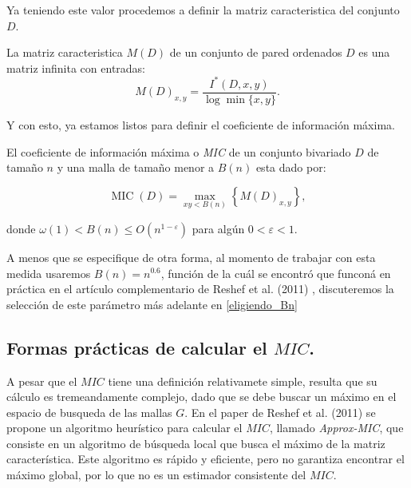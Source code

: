         Ya teniendo este valor procedemos a definir la matriz caracteristica del conjunto $D$.
    
        \begin{defn}
            La matriz caracteristica $M(D)$ de un conjunto de pared ordenados $D$ es una matriz infinita con entradas:
            $$
            M(D)_{x, y}=\frac{I^{*}(D, x, y)}{\log \min \{x, y\}}.
            $$
        \end{defn}

        Y con esto, ya estamos listos para definir el coeficiente de informaci\'on m\'axima.

        \begin{defn}
            El coeficiente de informaci\'on m\'axima o \textit{MIC} de un conjunto bivariado $D$ de tama\~no $n$ y una malla de tama\~no menor a $B(n)$ esta dado por:
    
            $$
            \operatorname{MIC}(D)=\max _{x y<B(n)}\left\{M(D)_{x, y}\right\},
            $$
    
            donde $\omega(1)<B(n) \leq O\left(n^{1-\varepsilon}\right)$ para alg\'un $0<\varepsilon<1$.
        \end{defn}
        \begin{rem}
            A menos que se especifique de otra forma, al momento de trabajar con esta medida usaremos $B(n)=n^{0.6}$, funci\'on de la cu\'al se encontr\'o que funcon\'a en pr\'actica en el art\'iculo complementario de Reshef et al. (2011) \cite[]{Reshef2011}, discuteremos la selecci\'on de este par\'ametro m\'as adelante en \ref{eligiendo_Bn}
        \end{rem}
    
    
        \subsection[Formas practicas de calcular el MIC.]{Formas pr\'acticas de calcular el $MIC$.}

        A pesar que el $MIC$ tiene una definici\'on relativamete simple, resulta que su c\'alculo es tremeandamente complejo, dado que se debe buscar un m\'aximo en el espacio de busqueda de las mallas $G$. En el paper de Reshef et al. (2011) \cite{Reshef2011} se propone un algoritmo heur\'istico para calcular el $MIC$, llamado \textit{Approx-MIC}, que consiste en un algoritmo de b\'usqueda local que busca el m\'aximo de la matriz caracter\'istica. Este algoritmo es r\'apido y eficiente, pero no garantiza encontrar el m\'aximo global, por lo que no es un estimador consistente del $MIC$.
    
